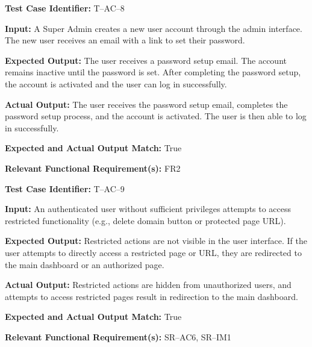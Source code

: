 \documentclass[12pt, titlepage]{article}
\begin{document}
\begin{mdframed}[linewidth=0.5mm]
\setlength{\parindent}{0pt}
\textbf{Test Case Identifier:} T--AC--8
\vspace{0.4em}

\textbf{Input:} A Super Admin creates a new user account through the admin interface. The new user receives an email with a link to set their password.
\vspace{0.4em}

\textbf{Expected Output:} The user receives a password setup email. The account remains inactive until the password is set. After completing the password setup, the account is activated and the user can log in successfully.
\vspace{0.4em}

\textbf{Actual Output:} The user receives the password setup email, completes the password setup process, and the account is activated. The user is then able to log in successfully.
\vspace{0.4em}

\textbf{Expected and Actual Output Match:} True
\vspace{0.4em}

\textbf{Relevant Functional Requirement(s):} FR2
\end{mdframed}
\begin{mdframed}[linewidth=0.5mm]
\setlength{\parindent}{0pt}
\textbf{Test Case Identifier:} T--AC--9
\vspace{0.4em}

\textbf{Input:} An authenticated user without sufficient privileges attempts to access restricted functionality (e.g., delete domain button or protected page URL).
\vspace{0.4em}

\textbf{Expected Output:} Restricted actions are not visible in the user interface. If the user attempts to directly access a restricted page or URL, they are redirected to the main dashboard or an authorized page.
\vspace{0.4em}

\textbf{Actual Output:} Restricted actions are hidden from unauthorized users, and attempts to access restricted pages result in redirection to the main dashboard.
\vspace{0.4em}

\textbf{Expected and Actual Output Match:} True
\vspace{0.4em}

\textbf{Relevant Functional Requirement(s):} SR--AC6, SR--IM1
\end{mdframed}
\end{document}
